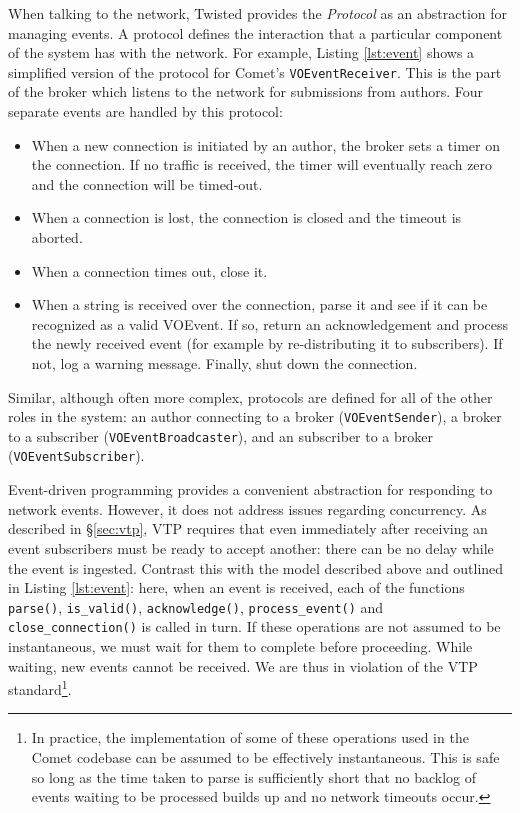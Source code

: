 \documentclass[5p,authoryear]{elsarticle}
\begin{document}
When talking to the network, Twisted provides the \textit{Protocol} as an
abstraction for managing events. A protocol defines the interaction that a
particular component of the system has with the network. For example, Listing
\ref{lst:event} shows a simplified version of the protocol for Comet's
\texttt{VOEventReceiver}. This is the part of the broker which listens to the
network for submissions from authors. Four separate events are handled by this
protocol:

\begin{itemize}

\item{When a new connection is initiated by an author, the broker sets a
timer on the connection. If no traffic is received, the timer will eventually
reach zero and the connection will be timed-out.}

\item{When a connection is lost, the connection is closed and the timeout is
aborted.}

\item{When a connection times out, close it.}

\item{When a string is received over the connection, parse it and see if it
can be recognized as a valid VOEvent. If so, return an acknowledgement and
process the newly received event (for example by re-distributing it to
subscribers). If not, log a warning message. Finally, shut down the
connection.}

\end{itemize}

Similar, although often more complex, protocols are defined for all of the
other roles in the system: an author connecting to a broker
(\texttt{VOEventSender}), a broker to a subscriber
(\texttt{VOEventBroadcaster}), and an subscriber to a broker
(\texttt{VOEventSubscriber}).

Event-driven programming provides a convenient abstraction for responding to
network events. However, it does not address issues regarding concurrency. As
described in \S\ref{sec:vtp}, VTP requires that even immediately after
receiving an event subscribers must be ready to accept another: there can be
no delay while the event is ingested. Contrast this with the model described
above and outlined in Listing \ref{lst:event}: here, when an event is
received, each of the functions \texttt{parse()}, \texttt{is\_valid()},
\texttt{acknowledge()}, \texttt{process\_event()} and
\texttt{close\_connection()} is called in turn.  If these operations are not
assumed to be instantaneous, we must wait for them to complete before
proceeding. While waiting, new events cannot be received.  We are thus in
violation of the VTP standard\footnote{In practice, the implementation of some
of these operations used in the Comet codebase can be assumed to be
effectively instantaneous.  This is safe so long as the time taken to parse is
sufficiently short that no backlog of events waiting to be processed  builds
up and no network timeouts occur.}.
\end{document}
